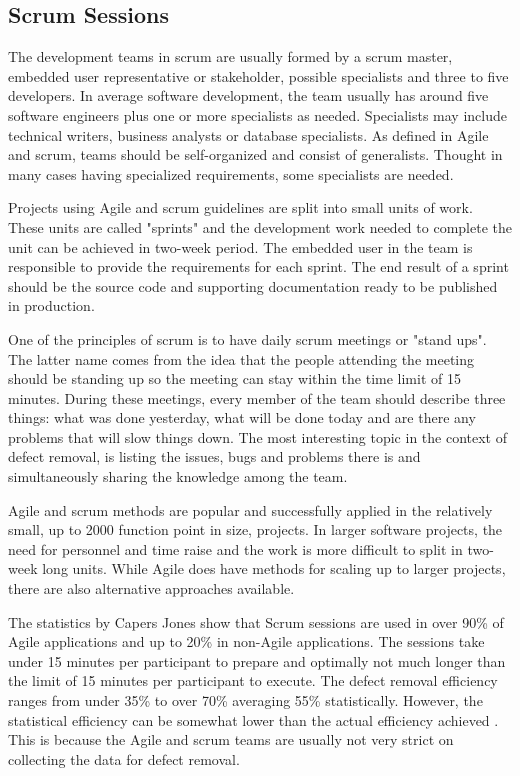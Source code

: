 \subsection{Scrum Sessions} 
\label{subsec:scrumsessions}

The development teams in scrum are usually formed by a scrum master, embedded user representative or stakeholder, possible specialists and three to five developers. In average software development, the team usually has around five software engineers plus one or more specialists as needed. Specialists may include technical writers, business analysts or database specialists. As defined in Agile and scrum, teams should be self-organized and consist of generalists. Thought in many cases having specialized requirements, some specialists are needed.

Projects using Agile and scrum guidelines are split into small units of work. These units are called "sprints" and the development work needed to complete the unit can be achieved in two-week period. The embedded user in the team is responsible to provide the requirements for each sprint. The end result of a sprint should be the source code and supporting documentation ready to be published in production.

One of the principles of scrum is to have daily scrum meetings or "stand ups". The latter name comes from the idea that the people attending the meeting should be standing up so the meeting can stay within the time limit of 15 minutes. During these meetings, every member of the team should describe three things: what was done yesterday, what will be done today and are there any problems that will slow things down. The most interesting topic in the context of defect removal, is listing the issues, bugs and problems there is and simultaneously sharing the knowledge among the team.

Agile and scrum methods are popular and successfully applied in the relatively small, up to 2000 function point in size, projects. In larger software projects, the need for personnel and time raise and the work is more difficult to split in two-week long units. While Agile does have methods for scaling up to larger projects, there are also alternative approaches available.

The statistics by Capers Jones show that Scrum sessions are used in over 90\% of Agile applications and up to 20\% in non-Agile applications. The sessions take under 15 minutes per participant to prepare and optimally not much longer than the limit of 15 minutes per participant to execute. The defect removal efficiency ranges from under 35\% to over 70\% averaging 55\% statistically. However, the statistical efficiency can be somewhat lower than the actual efficiency achieved . This is because the Agile and scrum teams are usually not very strict on collecting the data for defect removal.

